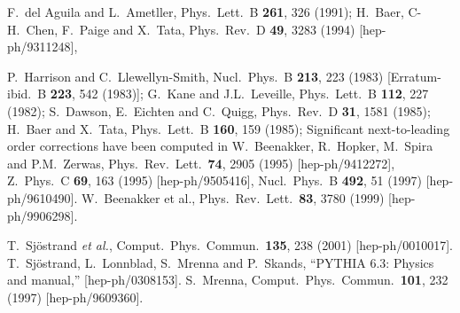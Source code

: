 \documentclass[11pt]{article}
\begin{document}
\begin{thebibliography}{999}
F.~del Aguila and L.~Ametller,
  Phys.\ Lett.\ B {\bf 261}, 326 (1991);
H.~Baer, C-H.~Chen, F.~Paige and X.~Tata, 
  Phys.\ Rev.\ D {\bf 49}, 3283 (1994)
  [hep-ph/9311248],

P.~Harrison and C.~Llewellyn-Smith,
  Nucl.\ Phys.\ B {\bf 213}, 223 (1983)
  [Erratum-ibid.\ B {\bf 223}, 542 (1983)];
G.~Kane and J.L.~Leveille,
  Phys.\ Lett.\ B {\bf 112}, 227 (1982);
S.~Dawson, E.~Eichten and C.~Quigg,
  Phys.\ Rev.\ D {\bf 31}, 1581 (1985);
H.~Baer and X.~Tata, 
  Phys.\ Lett.\ B {\bf 160}, 159 (1985);
Significant next-to-leading order corrections have been computed in 
W.~Beenakker, R.~Hopker, M.~Spira and P.M.~Zerwas,
  Phys.\ Rev.\ Lett.\  {\bf 74}, 2905 (1995)
  [hep-ph/9412272],
  Z.\ Phys.\ C {\bf 69}, 163 (1995)
  [hep-ph/9505416],
  Nucl.\ Phys.\ B {\bf 492}, 51 (1997)
  [hep-ph/9610490].
W.~Beenakker et al.,
  Phys.\ Rev.\ Lett.\  {\bf 83}, 3780 (1999)
  [hep-ph/9906298].

T.~Sj\"ostrand {\em et al.}, 
  Comput.\ Phys.\ Commun.\  {\bf 135}, 238 (2001)
  [hep-ph/0010017].
T.~Sj\"ostrand, L.~Lonnblad, S.~Mrenna and P.~Skands,
  ``PYTHIA 6.3: Physics and manual,''
  [hep-ph/0308153].
S.~Mrenna,
  Comput.\ Phys.\ Commun.\  {\bf 101}, 232 (1997)
  [hep-ph/9609360].


\end{thebibliography}
\end{document}
